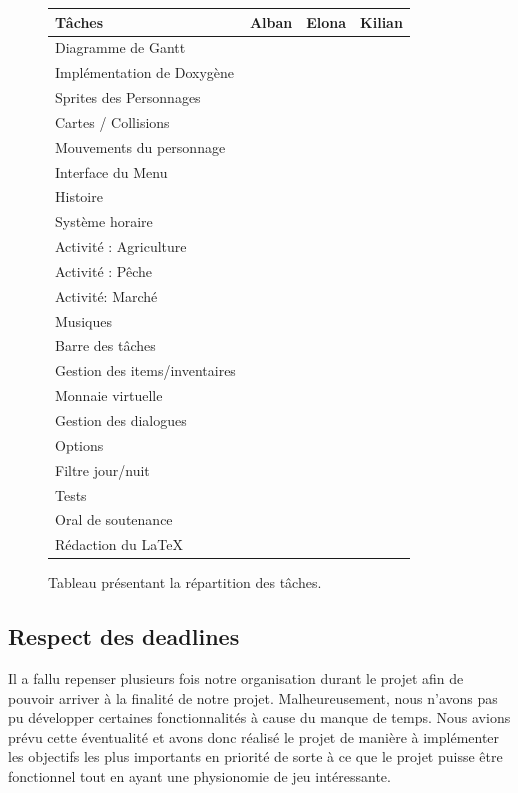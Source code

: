 \documentclass{article}
\newcommand{\Tache}{\cellcolor{blue!25}}
\begin{document}
\begin{figure}[h]
\begin{tabular}{|l|c|c|c|}
Tâches & Alban & Elona & Kilian \\
\hline
Diagramme de Gantt &\Tache & \Tache & \\
Implémentation de Doxygène & & \Tache & \Tache \\
Sprites des Personnages & & \Tache& \\
Cartes / Collisions & \Tache & & \\
Mouvements du personnage & & & \Tache \\
Interface du Menu & & \Tache & \Tache\\
Histoire &\Tache & &\\
Système horaire & & & \Tache \\
Activité : Agriculture & & & \Tache \\
Activité : Pêche &\Tache & & \Tache \\
Activité: Marché & &\Tache & \Tache \\
Musiques &\Tache & \Tache &\Tache \\
Barre des tâches &\Tache & & \\
Gestion des items/inventaires & & &\Tache \\
Monnaie virtuelle & & &\Tache \\
Gestion des dialogues & & &\Tache \\
Options & &\Tache & \\
Filtre jour/nuit & & &\Tache \\
Tests & \Tache & \Tache &\Tache \\
Oral de soutenance & \Tache & \Tache &\Tache \\
Rédaction du \LaTeX &\Tache &\Tache &\Tache \\


\end{tabular}
\caption{Tableau présentant la répartition des tâches.}\label{f1}
\end{figure}





\subsection{Respect des deadlines} %

Il a fallu repenser plusieurs fois notre organisation durant le projet afin de pouvoir arriver à la finalité de notre projet. Malheureusement, nous n'avons pas pu développer certaines fonctionnalités à cause du manque de temps. Nous avions prévu cette éventualité et avons donc réalisé le projet de manière à implémenter les objectifs les plus importants en priorité de sorte à ce que le projet puisse être fonctionnel tout en ayant une physionomie de jeu intéressante.
\end{document}
